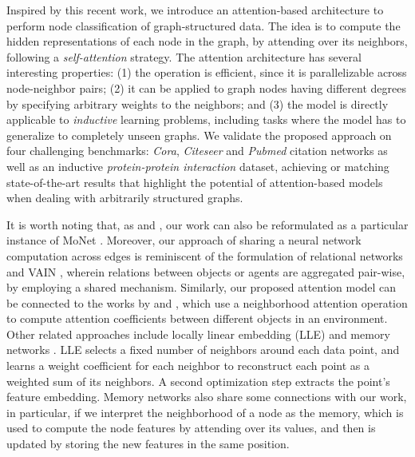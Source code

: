 \documentclass{article} %
\begin{document}
Inspired by this recent work, we introduce an attention-based architecture to perform node classification of graph-structured data. The idea is to compute the hidden representations of each node in the graph, by attending over its neighbors, following a \emph{self-attention} strategy. The attention architecture has several interesting properties: (1) the operation is efficient, since it is parallelizable across node-neighbor pairs; (2) it can be applied to graph nodes having different degrees by specifying arbitrary weights to the neighbors; and (3) the model is directly applicable to \emph{inductive} learning problems, including tasks where the model has to generalize to completely unseen graphs. We validate the proposed approach on four challenging benchmarks: \emph{Cora}, \emph{Citeseer} and \emph{Pubmed} citation networks as well as an inductive \emph{protein-protein interaction} dataset, achieving or matching state-of-the-art results that highlight the potential of attention-based models when dealing with arbitrarily structured graphs.

It is worth noting that, as \cite{kipf2016semi} and \cite{atwood2016diffusion}, our work can also be reformulated as a particular instance of MoNet \citep{monti2016geometric}. Moreover, our approach of sharing a neural network computation across edges is reminiscent of the formulation of relational networks \citep{santoro2017simple} and VAIN \citep{Hoshen17}, wherein relations between objects or agents %
are aggregated pair-wise, by employing a shared mechanism. Similarly, our proposed attention model can be connected to the works by \cite{duan2017one} and \cite{denil2017programmable}, which use a neighborhood attention operation to compute attention coefficients between different objects in an environment. Other related approaches include locally linear embedding (LLE) \citep{Roweis00nonlineardimensionality} and memory networks \citep{WestonCB14}. LLE selects a fixed number of neighbors around each data point, and learns a weight coefficient for each neighbor to reconstruct each point as a weighted sum of its neighbors. A second optimization step extracts the point's feature embedding. Memory networks also share some connections with our work, in particular, if we interpret the neighborhood of a node as the memory, which is used to compute the node features by attending over its values, and then is updated by storing the new features in the same position. 
\end{document}
